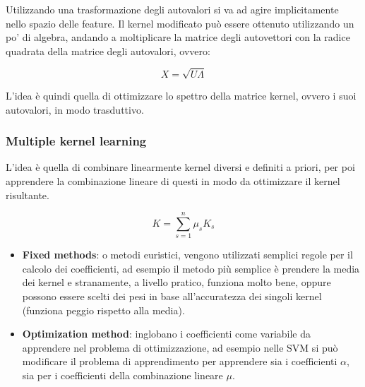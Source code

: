 Utilizzando una trasformazione degli autovalori si va ad agire
implicitamente nello spazio delle feature. 
Il kernel modificato può essere ottenuto utilizzando un po' di algebra, andando a
moltiplicare la matrice degli autovettori con la radice quadrata della
matrice degli autovalori, ovvero:

$$
X = \sqrt{U \Lambda}
$$

L'idea è quindi quella di ottimizzare lo spettro della matrice kernel, ovvero i suoi autovalori, in modo trasduttivo.

\subsubsection{Multiple kernel learning}\label{multiple-kernel-learning}

L'idea è quella di combinare linearmente kernel diversi e definiti a
priori, per poi apprendere la combinazione lineare di questi in modo da
ottimizzare il kernel risultante.

$$
K = \sum_{s=1}^n \mu_s K_s
$$

\begin{itemize}
\item
  \textbf{Fixed methods}: o metodi euristici, vengono utilizzati
  semplici regole per il calcolo dei coefficienti,
  ad esempio il metodo più semplice è prendere la media dei kernel e
  stranamente, a livello pratico, funziona molto bene, oppure possono
  essere scelti dei pesi in base all'accuratezza dei singoli kernel
  (funziona peggio rispetto alla media).
\item
  \textbf{Optimization method}: inglobano i coefficienti come variabile
  da apprendere nel problema di ottimizzazione, ad esempio nelle SVM si
  può modificare il problema di apprendimento per apprendere sia i
  coefficienti $\alpha$, sia per i coefficienti della combinazione lineare $\mu$.
\end{itemize}
